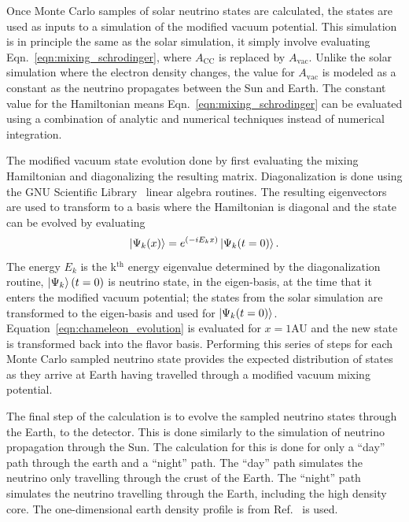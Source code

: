 Once  Monte Carlo samples of solar neutrino states are calculated, the
states are used as inputs to a simulation of the modified vacuum potential.
This simulation is in principle the same as the solar simulation,
it simply involve evaluating Eqn.~\eqref{eqn:mixing_schrodinger}, where 
$A_{\mathrm{CC}}$ is replaced by $A_{\mathrm{vac}}$.
Unlike the solar simulation where the electron density changes,
the value for $A_{\mathrm{vac}}$ is modeled as a constant 
as the neutrino propagates between the Sun and Earth.
The constant value for the Hamiltonian means
Eqn.~\eqref{eqn:mixing_schrodinger} can be evaluated using
a combination of analytic and numerical techniques instead of numerical
integration.

The modified vacuum state evolution done by first evaluating the mixing
Hamiltonian and diagonalizing the resulting matrix.
Diagonalization is done using the GNU Scientific Library~\cite{gsl_ref}
linear algebra routines.
The resulting eigenvectors are used to transform to a basis where the
Hamiltonian is diagonal and the state can be evolved by evaluating
\begin{equation}
\ket{\Psi_{k}(x)} = e^{(-iE_{k}x)} \ket{\Psi_{k}(t=0)}\text{.}
\label{eqn:chameleon_evolution}
\end{equation}
The energy $E_{k}$ is the k$^{\mathrm{th}}$ energy eigenvalue determined by the
diagonalization routine, $\ket{\Psi_{k}}(t=0)$ is neutrino state, in the eigen-basis, at
the time that it enters the modified vacuum potential;
the states from the solar simulation are transformed to the eigen-basis
and used for $\ket{\Psi_{k}(t=0)}$.
Equation~\eqref{eqn:chameleon_evolution} is evaluated for $x=1$AU
and the new state is transformed back into the flavor basis.
Performing this series of steps for each Monte Carlo sampled neutrino
state provides the expected distribution of states as they arrive at Earth
having travelled through a modified vacuum mixing potential.

The final step of the calculation is to evolve the sampled neutrino states through
the Earth, to the detector.
This is done similarly to the simulation of neutrino propagation through the
Sun.
The calculation for this is done for only a ``day'' path through the earth
and a ``night'' path. The ``day'' path simulates the neutrino only travelling
through the crust of the Earth. The ``night'' path simulates the neutrino
travelling through the Earth, including the high density core.
The one-dimensional earth density profile is from Ref.~\citep{PREM} is used.

